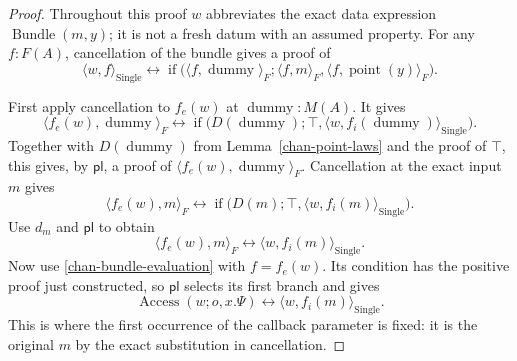 \begin{proof}
Throughout this proof $w$ abbreviates the exact data expression
$\operatorname{Bundle}(m,y)$; it is not a fresh datum with an assumed
property.  For any $f:F(A)$, cancellation of the bundle gives a proof of
\begin{equation}
 \langle w,f\rangle_{\operatorname{Single}}
 \leftrightarrow
 \operatorname{if}\bigl(
    \langle f,\operatorname{dummy}\rangle_F;
    \langle f,m\rangle_F,
    \langle f,\operatorname{point}(y)\rangle_F\bigr).
\label{chan-bundle-evaluation}
\end{equation}

First apply cancellation to $f_e(w)$ at
$\operatorname{dummy}:M(A)$.  It gives
\[
 \langle f_e(w),\operatorname{dummy}\rangle_F
 \leftrightarrow
 \operatorname{if}\bigl(D(\operatorname{dummy});\top,
      \langle w,f_i(\operatorname{dummy})\rangle_{\operatorname{Single}}\bigr).
\]
Together with $D(\operatorname{dummy})$ from
Lemma~\ref{chan-point-laws} and the proof of $\top$, this gives, by
$\mathsf{pl}$, a proof of
$\langle f_e(w),\operatorname{dummy}\rangle_F$.
Cancellation at the exact input $m$ gives
\[
 \langle f_e(w),m\rangle_F
 \leftrightarrow
 \operatorname{if}\bigl(D(m);\top,
                  \langle w,f_i(m)\rangle_{\operatorname{Single}}\bigr).
\]
Use $d_m$ and $\mathsf{pl}$ to obtain
\[
 \langle f_e(w),m\rangle_F
       \leftrightarrow\langle w,f_i(m)\rangle_{\operatorname{Single}}.
\]
Now use \eqref{chan-bundle-evaluation} with $f=f_e(w)$.  Its condition has
the positive proof just constructed, so $\mathsf{pl}$ selects its first
branch and gives
\begin{equation}
 \operatorname{Access}(w;o,x.\Psi)
       \leftrightarrow\langle w,f_i(m)\rangle_{\operatorname{Single}}.
\label{chan-access-first-selection}
\end{equation}
This is where the first occurrence of the callback parameter is fixed:
it is the original $m$ by the exact substitution in cancellation.


\end{proof}
